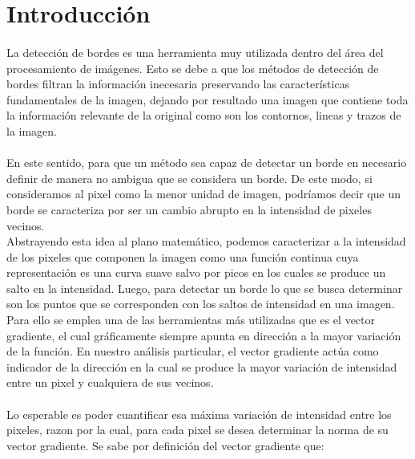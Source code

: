 \documentclass[11pt, a4paper]{article}
\begin{document}
\newpage



\section{Introducci\'on}

\paragraph{}
La detecci\'on de bordes es una herramienta muy utilizada dentro del \'area del procesamiento de im\'agenes. Esto se debe a que los m\'etodos de detecci\'on de bordes filtran la informaci\'on inecesaria preservando las caracter\'isticas fundamentales de la imagen, dejando por resultado una imagen que contiene toda la informaci\'on relevante de la original como son los contornos, lineas y trazos de la imagen.

\paragraph{}
En este sentido, para que un m\'etodo sea capaz de detectar un borde en necesario definir de manera no ambigua que se considera un borde. De este modo, si consideramos al pixel como la menor unidad de imagen, podr\'iamos decir que un borde se caracteriza por ser un cambio abrupto en la intensidad de pixeles vecinos.\\
Abstrayendo esta idea al plano matem\'atico, podemos caracterizar a la intensidad de los pixeles que componen la imagen como una funci\'on continua cuya representaci\'on es una curva suave salvo por picos en los cuales se produce un salto en la intensidad. Luego, para detectar un borde lo que se busca determinar son los puntos que se corresponden con los saltos de intensidad en una imagen.\\
Para ello se emplea una de las herramientas m\'as utilizadas que es el vector gradiente, el cual gr\'aficamente siempre apunta en direcci\'on a la mayor variaci\'on de la funci\'on. En nuestro an\'alisis particular, el vector gradiente act\'ua como indicador de la direcci\'on en la cual se produce la mayor variaci\'on de intensidad entre un pixel y cualquiera de sus vecinos.

\paragraph{}
Lo esperable es poder cuantificar esa m\'axima variaci\'on de intensidad entre los pixeles, razon por la cual, para cada pixel se desea determinar la norma de su vector gradiente. Se sabe por definici\'on del vector gradiente que:
\end{document}
